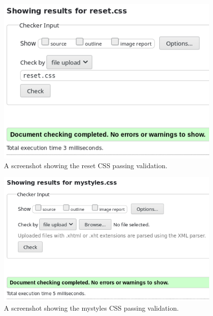 \documentclass[a4paper]{scrartcl}
\begin{document}
\begin{figure}[h!]
    \begin{center}
        \includegraphics[scale=0.2]{images/reset-validated.png}
        \caption{A screenshot showing the reset CSS passing validation.}
        \label{fig:reset-validated}
    \end{center}
\end{figure}

\begin{figure}[h!]
    \begin{center}
        \includegraphics[scale=0.2]{images/mystyles-validated.png}
        \caption{A screenshot showing the mystyles CSS passing validation.}
        \label{fig:mystyles-validated}
    \end{center}
\end{figure}
\end{document}
